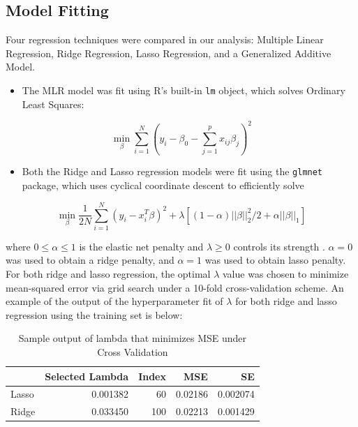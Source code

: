 \documentclass[aoas]{imsart}
\providecommand{\tightlist}{%
  \setlength{\itemsep}{0pt}\setlength{\parskip}{0pt}}
\numberwithin{equation}{section}
\theoremstyle{plain}
\theoremstyle{remark}
\begin{document}
\hypertarget{model-fitting}{%
\subsection{Model Fitting}\label{model-fitting}}

Four regression techniques were compared in our analysis: Multiple
Linear Regression, Ridge Regression, Lasso Regression, and a Generalized
Additive Model.

\begin{itemize}
\tightlist
\item
  The MLR model was fit using R's built-in \texttt{lm} object, which
  solves Ordinary Least Squares:
\end{itemize}

\[
\min_{\beta} \sum_{i=1}^N(y_i - \beta_0 - \sum_{j=1}^px_{ij}\beta_j)^2
\]

\begin{itemize}
\tightlist
\item
  Both the Ridge and Lasso regression models were fit using the
  \texttt{glmnet} package, which uses cyclical coordinate descent to
  efficiently solve
\end{itemize}

\[
\min_{\beta}\frac{1}{2N}\sum_{i=1}^N(y_i-x_i^T\beta)^2 + \lambda[(1-\alpha)||\beta||_2^2/2 + \alpha||\beta||_1]
\]

where \(0 \leq \alpha \leq 1\) is the elastic net penalty and
\(\lambda \geq 0\) controls its strength \citep{JSSv033i01}.
\(\alpha=0\) was used to obtain a ridge penalty, and \(\alpha=1\) was
used to obtain lasso penalty. For both ridge and lasso regression, the
optimal \(\lambda\) value was chosen to minimize mean-squared error via
grid search under a 10-fold cross-validation scheme. An example of the
output of the hyperparameter fit of \(\lambda\) for both ridge and lasso
regression using the training set is below:

\begin{table}[H]

\caption{\label{tab:unnamed-chunk-5}Sample output of lambda that minimizes MSE under Cross Validation}
\centering
\begin{tabular}[t]{lrrrr}
\hline
  & Selected Lambda & Index & MSE & SE\\
\hline
Lasso & 0.001382 & 60 & 0.02186 & 0.002074\\
Ridge & 0.033450 & 100 & 0.02213 & 0.001429\\
\hline
\end{tabular}
\end{table}
\end{document}
